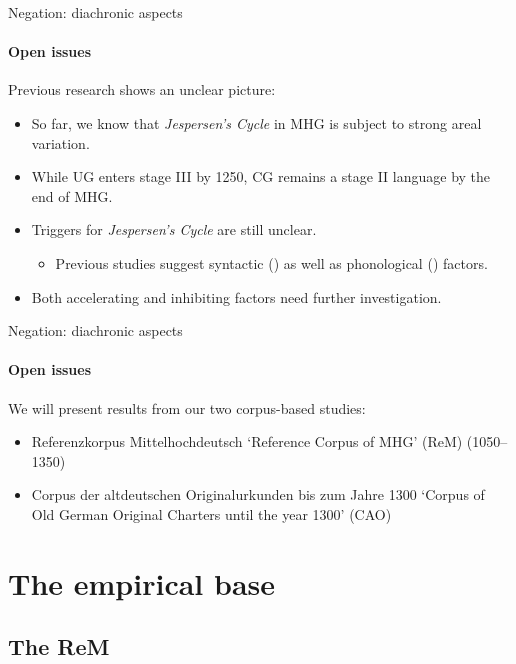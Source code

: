 \documentclass[xcolor=table, compress, %
handout
]{beamer}
\begin{document}
\begin{frame}{Negation: diachronic aspects}
\framesubtitle{Open issues}

Previous research shows an unclear picture:

\begin{itemize}
    \item So far, we know that \textit{Jespersen's Cycle} in MHG is subject to strong areal variation.
    \item While UG enters stage III by 1250, CG remains a stage II language by the end of MHG.
    \item Triggers for \textit{Jespersen's Cycle} are still unclear.
    \begin{itemize}
    \item Previous studies suggest syntactic (\citealt{jaeger08,Breitbarth2014}) as well as phonological (\citealt{HertelimErscheinen}) factors.
    \end{itemize}
    \item Both accelerating and inhibiting factors need further investigation.
    
\end{itemize}


\end{frame}


\begin{frame}{Negation: diachronic aspects}
\framesubtitle{Open issues}

We will present results from our two corpus-based studies:

\begin{itemize}
    \item \alert{Referenzkorpus Mittelhochdeutsch}  ‘Reference Corpus of MHG’ (ReM) (1050–1350)
    \item \alert{Corpus der altdeutschen Originalurkunden bis zum Jahre 1300} ‘Corpus of Old German Original Charters until the year 1300’ (CAO)
\end{itemize}

\end{frame}



\section{The empirical base}
\subsection{The ReM}
\end{document}

